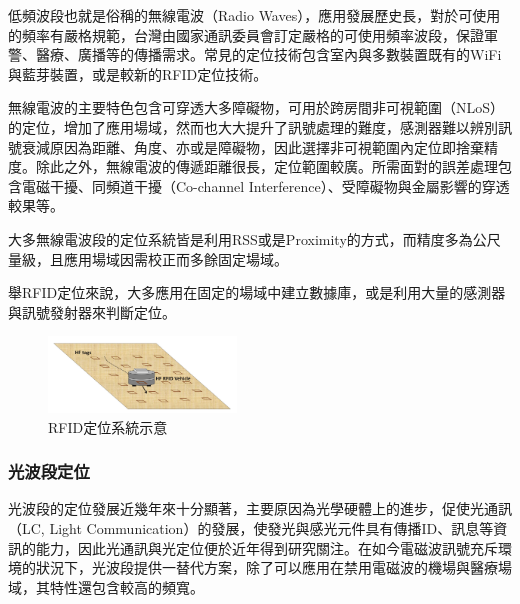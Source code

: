         
        低頻波段也就是俗稱的無線電波（Radio Waves），應用發展歷史長，對於可使用的頻率有嚴格規範，台灣由國家通訊委員會訂定嚴格的可使用頻率波段\cite{rf_law}，保證軍警、醫療、廣播等的傳播需求。常見的定位技術包含室內與多數裝置既有的WiFi與藍芽裝置，或是較新的RFID定位技術。
        
        無線電波的主要特色包含可穿透大多障礙物，可用於跨房間非可視範圍（NLoS）的定位\cite{survey_indoor2018}，增加了應用場域，然而也大大提升了訊號處理的難度，感測器難以辨別訊號衰減原因為距離、角度、亦或是障礙物，因此選擇非可視範圍內定位即捨棄精度。除此之外，無線電波的傳遞距離很長，定位範圍較廣。所需面對的誤差處理包含電磁干擾、同頻道干擾（Co-channel Interference）、受障礙物與金屬影響的穿透較果等。

        大多無線電波段的定位系統皆是利用RSS或是Proximity的方式，而精度多為公尺量級，且應用場域因需校正而多餘固定場域。
        
        舉RFID定位來說，大多應用在固定的場域中建立數據庫，或是利用大量的感測器與訊號發射器來判斷定位\cite{survey_rfid}。

        \begin{figure}[ht]
            \centering
            \includegraphics[width=5cm]{ch2pic/rfid_system.png}
            \caption{RFID定位系統示意\cite{survey_rfid}}
            \label{pic:rfid_system}
        \end{figure}



    \subsubsection{光波段定位}

        光波段的定位發展近幾年來十分顯著，主要原因為光學硬體上的進步，促使光通訊（LC, Light Communication）的發展，使發光與感光元件具有傳播ID、訊息等資訊的能力，因此光通訊與光定位便於近年得到研究關注。在如今電磁波訊號充斥環境的狀況下，光波段提供一替代方案，除了可以應用在禁用電磁波的機場與醫療場域，其特性還包含較高的頻寬。
        

